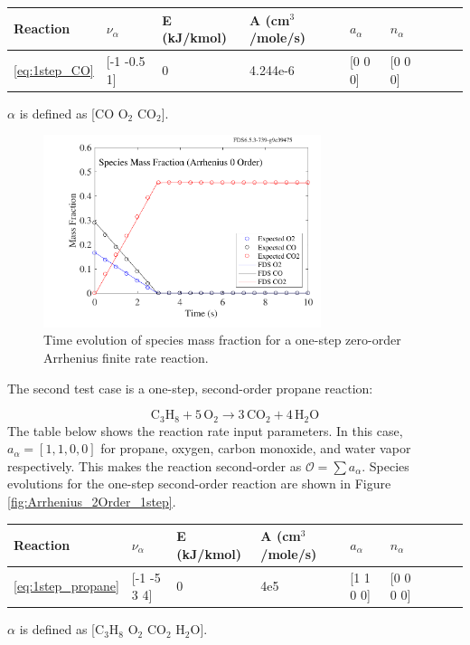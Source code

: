 \documentclass[11pt]{book}
\begin{document}
\begin{center}
\begin{tabular}{|l|l|l|l|l|l|l|l|l|}
\hline Reaction & $\nu_{\alpha}$ & E (kJ/kmol) & A (cm$^3$/mole/s) & $a_{\alpha}$ & $n_{\alpha}$  \\ \hline \hline
\ref{eq:1step_CO} & [-1 -0.5 1] & 0 & 4.244e-6 & [0 0 0] & [0 0 0] \\ \hline
\end{tabular}
\vskip8pt
$\alpha$ is defined as [$\mathrm{CO}$ $\mathrm{O_2}$ $\mathrm{CO_2}$].
\end{center}

\begin{figure}[ht]
\begin{center}
\includegraphics[width=3.2in]{SCRIPT_FIGURES/ReactionRate_Arrhenius_0Order_1Step}
\end{center}
\caption[Species Evolution in Finite Rate Reaction]{Time evolution of species mass fraction for a one-step zero-order Arrhenius finite rate reaction.}
\label{fig:Arrhenius_0Order_1step}
\end{figure}
The second test case is a one-step, second-order propane reaction:

\begin{equation}\label{eq:1step_propane}
\mathrm{C_3H_8 + 5 \, O_2 \rightarrow  3 \, CO_2 + 4 \, H_2O}
\end{equation}
The table below shows the reaction rate input parameters. In this case, $a_{\alpha}=[1,1,0,0]$  for propane, oxygen, carbon monoxide, and water vapor respectively. This makes the reaction second-order as $\mathcal{O}=\sum a_{\alpha}$. Species evolutions for the one-step second-order reaction are shown in Figure \ref{fig:Arrhenius_2Order_1step}.

\begin{center}
\begin{tabular}{|l|l|l|l|l|l|l|l|l|}
\hline Reaction & $\nu_{\alpha}$ & E (kJ/kmol) & A (cm$^3$/mole/s) & $a_{\alpha}$ & $n_{\alpha}$  \\ \hline \hline
\ref{eq:1step_propane} & [-1 -5 3 4] & 0 & 4e5 & [1 1 0 0] & [0 0 0 0] \\ \hline
\end{tabular}
\vskip8pt
$\alpha$ is defined as [$\mathrm{C_3H_8}$ $\mathrm{O_2}$ $\mathrm{CO_2}$ $\mathrm{H_2O}$].
\end{center}
\end{document}

